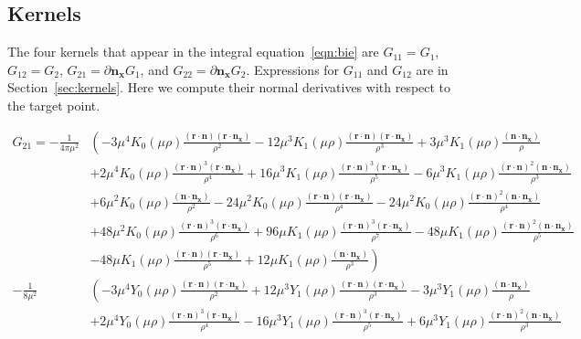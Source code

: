 \documentclass[times]{article}
\newcommand{\ndotnx}{\nn \cdot \nn_{\xx}}
\newcommand{\nn}{\mathbf{n}}
\newcommand{\rdotn}{\rr \cdot \nn}
\newcommand{\rdotnx}{\rr \cdot \nn_{\xx}}
\newcommand{\rr}{\mathbf{r}}
\newcommand{\xx}{\mathbf{x}}
\begin{document}
\begin{appendices}
\section{Kernels}
\label{app:kernels}

The four kernels that appear in the integral equation~\eqref{eqn:bie}
are $G_{11} = G_{1}$, $G_{12} = G_{2}$, $G_{21} =
\partial{\nn_{\xx}}G_{1}$, and $G_{22} = \partial{\nn_{\xx}}G_{2}$.
Expressions for $G_{11}$ and $G_{12}$ are in Section~\ref{sec:kernels}.
Here we compute their normal derivatives with respect to the target
point.

\begin{align*}
  G_{21} = -\frac{1}{4\pi\mu^{2}}&\left(
    -3\mu^{4}K_{0}(\mu\rho)\frac{(\rdotn)(\rdotnx)}{\rho^{2}}
    -12\mu^{3}K_{1}(\mu\rho)\frac{(\rdotn)(\rdotnx)}{\rho^{3}}
    +3\mu^{3}K_{1}(\mu\rho)\frac{(\ndotnx)}{\rho}
  \right. \\
  &\left.
    +2\mu^{4}K_{0}(\mu\rho)\frac{(\rdotn)^{3}(\rdotnx)}{\rho^{4}}
    +16\mu^{3}K_{1}(\mu\rho)\frac{(\rdotn)^{3}(\rdotnx)}{\rho^{5}}
    -6\mu^{3}K_{1}(\mu\rho)\frac{(\rdotn)^{2}(\ndotnx)}{\rho^{3}}
  \right. \\
  &\left.
    +6\mu^{2}K_{0}(\mu\rho)\frac{(\ndotnx)}{\rho^{2}} 
    -24\mu^{2}K_{0}(\mu\rho)\frac{(\rdotn)(\rdotnx)}{\rho^4}
    -24\mu^{2}K_{0}(\mu\rho)\frac{(\rdotn)^{2}(\ndotnx)}{\rho^{4}}
  \right. \\
  &\left.
    +48\mu^{2}K_{0}(\mu\rho)\frac{(\rdotn)^{3}(\rdotnx)}{\rho^{6}}
    +96\mu K_{1}(\mu\rho)\frac{(\rdotn)^{3}(\rdotnx)}{\rho^{7}}
    -48\mu K_{1}(\mu\rho)\frac{(\rdotn)^{2}(\ndotnx)}{\rho^{5}}
  \right. \\
  &\left.
     -48\mu K_{1}(\mu\rho)\frac{(\rdotn)(\rdotnx)}{\rho^{5}}
     +12\mu K_{1}(\mu\rho)\frac{(\ndotnx)}{\rho^{3}}
  \right) \\
  -\frac{1}{8\mu^{2}}&\left(
    -3\mu^{4}Y_{0}(\mu\rho)\frac{(\rdotn)(\rdotnx)}{\rho^{2}}
    +12\mu^{3}Y_{1}(\mu\rho)\frac{(\rdotn)(\rdotnx)}{\rho^{3}}
    -3\mu^{3}Y_{1}(\mu\rho)\frac{(\ndotnx)}{\rho}
  \right. \\
  &\left.
    +2\mu^{4}Y_{0}(\mu\rho)\frac{(\rdotn)^{3}(\rdotnx)}{\rho^{4}}
    -16\mu^{3}Y_{1}(\mu\rho)\frac{(\rdotn)^{3}(\rdotnx)}{\rho^{5}}
    +6\mu^{3}Y_{1}(\mu\rho)\frac{(\rdotn)^{2}(\ndotnx)}{\rho^{3}}
  \right. \\

\end{align*}
\end{appendices}
\end{document}

